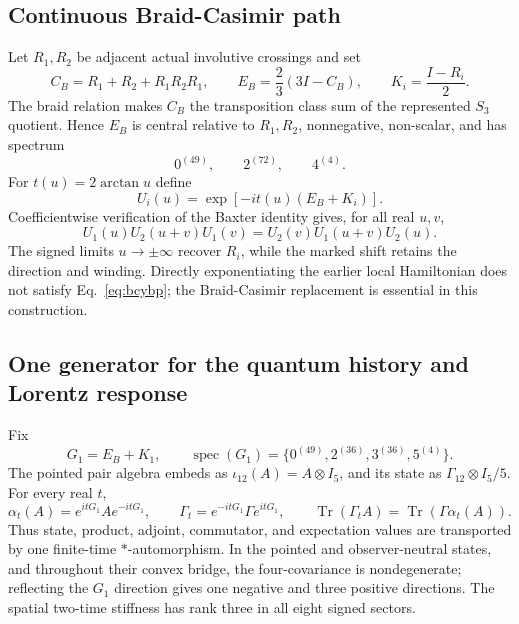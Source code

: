\documentclass[11pt]{article}
\theoremstyle{definition}
\theoremstyle{remark}
\newcommand{\Tr}{\operatorname{Tr}}
\begin{document}
\subsection{Continuous Braid-Casimir path}

Let $R_1,R_2$ be adjacent actual involutive crossings and set
\begin{equation}
 C_B=R_1+R_2+R_1R_2R_1,
 \qquad E_B=\frac23(3I-C_B),
 \qquad K_i=\frac{I-R_i}{2}.
\end{equation}
The braid relation makes $C_B$ the transposition class sum of the represented $S_3$ quotient. Hence $E_B$ is central relative to $R_1,R_2$, nonnegative, non-scalar, and has spectrum
\begin{equation}
 0^{(49)},\qquad 2^{(72)},\qquad 4^{(4)}.
\end{equation}
For $t(u)=2\arctan u$ define
\begin{equation}
 U_i(u)=\exp[-it(u)(E_B+K_i)].
\end{equation}
Coefficientwise verification of the Baxter identity gives, for all real $u,v$,
\begin{equation}\label{eq:bcybp}
 U_1(u)U_2(u+v)U_1(v)=U_2(v)U_1(u+v)U_2(u).
\end{equation}
The signed limits $u\to\pm\infty$ recover $R_i$, while the marked shift retains the direction and winding. Directly exponentiating the earlier local Hamiltonian does not satisfy Eq.~\eqref{eq:bcybp}; the Braid-Casimir replacement is essential in this construction.

\subsection{One generator for the quantum history and Lorentz response}

Fix
\begin{equation}
 G_1=E_B+K_1,
 \qquad \operatorname{spec}(G_1)=\{0^{(49)},2^{(36)},3^{(36)},5^{(4)}\}.
\end{equation}
The pointed pair algebra embeds as $\iota_{12}(A)=A\otimes I_5$, and its state as $\Gamma_{12}\otimes I_5/5$. For every real $t$,
\begin{equation}
 \alpha_t(A)=e^{itG_1}Ae^{-itG_1},
 \qquad \Gamma_t=e^{-itG_1}\Gamma e^{itG_1},
 \qquad \Tr(\Gamma_tA)=\Tr(\Gamma\alpha_t(A)).
\end{equation}
Thus state, product, adjoint, commutator, and expectation values are transported by one finite-time $*$-automorphism. In the pointed and observer-neutral states, and throughout their convex bridge, the four-covariance is nondegenerate; reflecting the $G_1$ direction gives one negative and three positive directions. The spatial two-time stiffness has rank three in all eight signed sectors.
\end{document}
